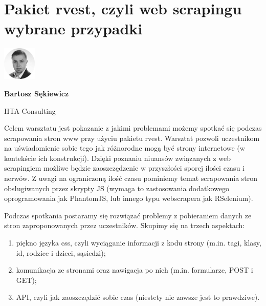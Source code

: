 \documentclass[\main/boa.tex]{subfiles}
\begin{document}
\section{Pakiet rvest, czyli web scrapingu wybrane przypadki}
\begin{minipage}[t]{0.915\textwidth}
	\center     
    \includegraphics[width=60px]{img/workshops/czarno_biale/bartosz-crop.png} 
\end{minipage}

\begin{minipage}{0.915\textwidth}
\centering
{\bf {} Bartosz Sękiewicz}
\end{minipage}

\vskip 0.3cm

\begin{affiliations}
\begin{minipage}{0.915\textwidth}
\centering
\large HTA Consulting  \\[2pt]
\end{minipage}
\end{affiliations}

\vskip 0.8cm

\opiswarsztatu Celem warsztatu jest pokazanie z jakimi problemami możemy spotkać się podczas scrapowania stron www przy użyciu pakietu rvest. Warsztat pozwoli uczestnikom na uświadomienie sobie tego jak różnorodne mogą być strony internetowe (w kontekście ich konstrukcji). Dzięki poznaniu niuansów związanych z web scrapingiem możliwe będzie zaoszczędzenie w przyszłości sporej ilości czasu i nerwów. Z uwagi na ograniczoną ilość czasu pominiemy temat scrapowania stron obsługiwanych przez skrypty JS (wymaga to zastosowania dodatkowego oprogramowania jak PhantomJS, lub innego typu webscrapera jak RSelenium).

\planwarsztatu Podczas spotkania postaramy się rozwiązać problemy z pobieraniem danych ze stron zaproponowanych przez uczestników. Skupimy się na trzech aspektach:
\begin{enumerate}
\item piękno języka css, czyli wyciąganie informacji z kodu strony (m.in. tagi, klasy, id, rodzice i dzieci, sąsiedzi);
\item komunikacja ze stronami oraz nawigacja po nich (m.in. formularze, POST i GET);
\item API, czyli jak zaoszczędzić sobie czas (niestety nie zawsze jest to prawdziwe).
\end{enumerate}	 
\end{document}

